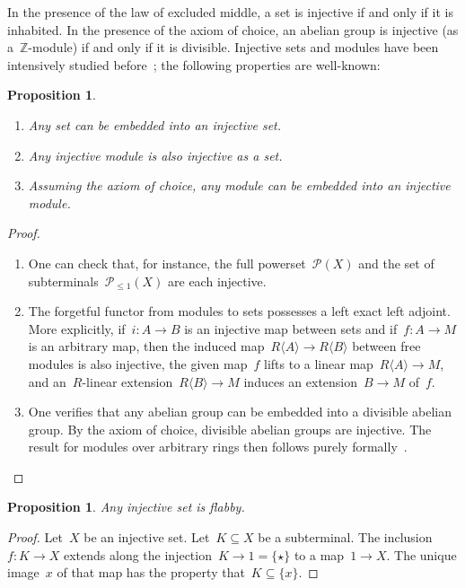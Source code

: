 \documentclass[oneside]{amsart}
\theoremstyle{definition}
\theoremstyle{plain}
\newtheorem{prop}[defn]{Proposition}
\theoremstyle{remark}
\newcommand{\ZZ}{\mathbb{Z}}
\renewcommand{\P}{\mathcal{P}}
\renewcommand{\_}{\mathpunct{.}\,}
\begin{document}
In the presence of the law of excluded middle, a set is injective if and only
if it is inhabited. In the presence of the axiom of choice, an abelian group is
injective (as a~$\ZZ$-module) if and only if it is divisible. Injective sets
and modules have been intensively studied before~\cite{XXX}; the following
properties are well-known:

\begin{prop}\label{prop:basics-injective}
\begin{enumerate}
\item Any set can be embedded into an injective set.
\item Any injective module is also injective as a set.
\item Assuming the axiom of choice, any module can be embedded into an
injective module.
\end{enumerate}\end{prop}

\begin{proof}\begin{enumerate}
\item One can check that, for instance, the full powerset~$\P(X)$ and the set of
subterminals~$\P_{\leq 1}(X)$ are each injective.~\cite{XXX}
\item The forgetful functor from modules to sets possesses a left exact left
adjoint. More explicitly, if~$i : A \to B$ is an injective map between sets and
if~$f : A \to M$ is an arbitrary map, then the induced map~$R\langle A \rangle
\to R\langle B \rangle$ between free modules is also injective, the given
map~$f$ lifts to a linear map~$R\langle A \rangle \to M$, and an~$R$-linear
extension~$R\langle B \rangle \to M$ induces an extension~$B \to M$ of~$f$.
\item One verifies that any abelian group can be embedded into a divisible
abelian group. By the axiom of choice, divisible abelian groups are injective.
The result for modules over arbitrary rings then follows purely
formally~\cite{XXX}. \qedhere
\end{enumerate}\end{proof}

\begin{prop}\label{prop:injective-flabby}
Any injective set is flabby.\end{prop}

\begin{proof}Let~$X$ be an injective set. Let~$K \subseteq X$ be a subterminal.
The inclusion~$f : K \to X$ extends along the injection~$K \to 1 = \{\star\}$
to a map~$1 \to X$. The unique image~$x$ of that map has the property that~$K
\subseteq \{x\}$.\end{proof}
\end{document}
